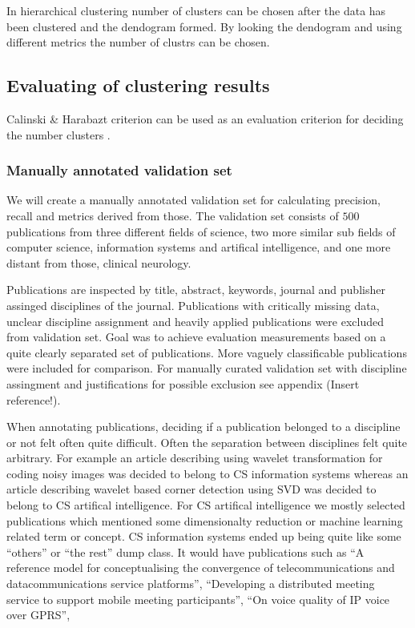 In hierarchical clustering number of clusters can be chosen after 
the data has been clustered and the dendogram formed. 
 By 
looking the dendogram and using different metrics the number of 
clustrs can be chosen.


\subsection{Evaluating of clustering results}
Calinski \& Harabazt criterion can be used as an evaluation 
criterion for deciding the number clusters . 

\subsubsection{Manually annotated validation set}
We will create a manually annotated validation set for calculating
precision, recall and metrics derived from those. The validation
set consists of $500$ publications from three different fields of
science, two more similar sub fields of computer science, 
information systems and artifical intelligence, and one more
distant from those, clinical neurology.

Publications are inspected by title, abstract, keywords, journal
and publisher assinged disciplines of the journal. Publications
with critically missing data, unclear discipline assignment and
heavily applied publications were excluded from validation set.
Goal was to achieve evaluation measurements based on a quite 
clearly separated set of publications. More vaguely classificable
publications were included for comparison. For manually curated 
validation set with discipline assingment and justifications for
possible exclusion see appendix (Insert reference!).

When annotating publications, deciding if a publication belonged to
a discipline or not felt often quite difficult. Often the 
separation between disciplines felt quite arbitrary. For example
an article describing using wavelet transformation for coding noisy
images was decided to belong to CS information systems whereas an
article describing wavelet based corner detection using SVD was
decided to belong to CS artifical intelligence.
For CS artifical intelligence we mostly selected publications which
mentioned some dimensionalty reduction or machine learning related
term or concept.
CS information systems ended up being quite like some ``others'' or
``the rest'' dump class. It would have publications such as
``A reference model for conceptualising the convergence of 
telecommunications and datacommunications service platforms'',
``Developing a distributed meeting service to support mobile 
meeting participants'',
``On voice quality of IP voice over GPRS'',
